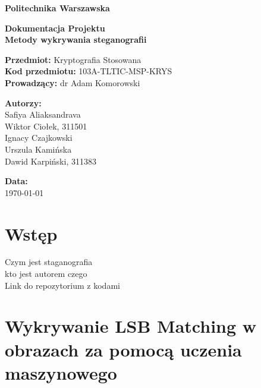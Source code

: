 \documentclass[a4paper,12pt]{article}
\begin{document}
\begin{titlepage}
	\begin{center}
		\vspace*{1cm}

		\textbf{\Huge Politechnika Warszawska}\\
		\vspace{2cm}

		\textbf{\LARGE Dokumentacja Projektu}\\
		\vspace{0.5cm}
		\textbf{\Large Metody wykrywania steganografii}\\

		\vspace{2cm}

		\textbf{Przedmiot:} Kryptografia Stosowana \\
		\textbf{Kod przedmiotu:} 103A-TLTIC-MSP-KRYS \\
		\textbf{Prowadzący:} dr Adam Komorowski \\

		\vfill

		\textbf{Autorzy:}\\
		\vspace{0.5cm}
		Safiya Aliaksandrava\\
		Wiktor Ciołek, 311501\\
		Ignacy Czajkowski\\
		Urszula Kamińska\\
		Dawid Karpiński, 311383\\

		\vspace{1cm}

		\textbf{Data:} \\
		\today

		\vspace{2cm}
	\end{center}
\end{titlepage}

\section{Wstęp}
Czym jest staganografia\\
kto jest autorem czego\\
Link do repozytorium z kodami

\clearpage
\section{Wykrywanie LSB Matching w obrazach za pomocą uczenia maszynowego}

\end{document}
